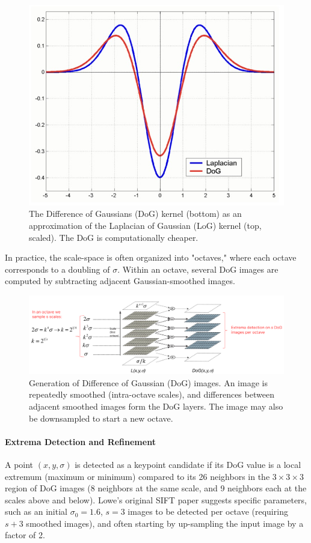 \begin{figure}[htbp]
  \centering
  \includegraphics[width=0.5\linewidth]{./img/dog.jpg}
  \caption{The Difference of Gaussians (DoG) kernel (bottom) as an approximation of the Laplacian of Gaussian (LoG) kernel (top, scaled). The DoG is computationally cheaper.}
  \label{fig:dog}
\end{figure}

In practice, the scale-space is often organized into "octaves," where each octave corresponds to a doubling of $\sigma$. Within an octave, several DoG images are computed by subtracting adjacent Gaussian-smoothed images.

\begin{figure}[htbp]
  \centering
  \includegraphics[width=0.9\linewidth]{./img/dog_1.png}
  \caption{Generation of Difference of Gaussian (DoG) images. An image is repeatedly smoothed (intra-octave scales), and differences between adjacent smoothed images form the DoG layers. The image may also be downsampled to start a new octave.}
  \label{fig:dog_1}
\end{figure}

\paragraph{Extrema Detection and Refinement}
A point $(x,y,\sigma)$ is detected as a keypoint candidate if its DoG value is a local extremum (maximum or minimum) compared to its 26 neighbors in the $3 \times 3 \times 3$ region of DoG images (8 neighbors at the same scale, and 9 neighbors each at the scales above and below).
Lowe's original SIFT paper suggests specific parameters, such as an initial $\sigma_0 = 1.6$, $s=3$ images to be detected per octave (requiring $s+3$ smoothed images), and often starting by up-sampling the input image by a factor of 2.


